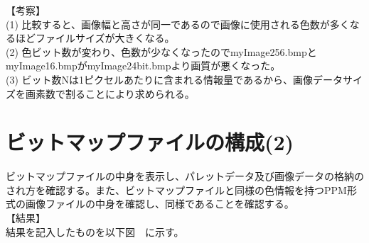 \documentclass[uplatex, titlepage]{jsarticle}
\begin{document}
【考察】\\
(1) 比較すると、画像幅と高さが同一であるので画像に使用される色数が多くなるほどファイルサイズが大きくなる。\\
(2) 色ビット数が変わり、色数が少なくなったのでmyImage256.bmpとmyImage16.bmpがmyImage24bit.bmpより画質が悪くなった。\\
(3) ビット数Nは1ピクセルあたりに含まれる情報量であるから、画像データサイズを画素数で割ることにより求められる。\\

\section{ビットマップファイルの構成(2)}

  ビットマップファイルの中身を表示し、パレットデータ及び画像データの格納のされ方を確認する。また、ビットマップファイルと同様の色情報を持つPPM形式の画像ファイルの中身を確認し、同様であることを確認する。\\

【結果】\\

  結果を記入したものを以下図　に示す。\\
\end{document}
